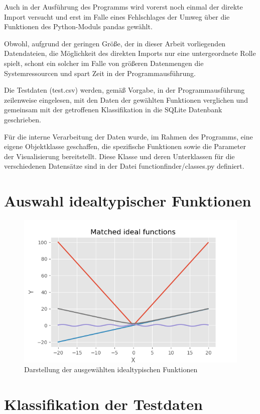 Auch in der Ausführung des Programms wird vorerst noch einmal der direkte Import versucht und erst im Falle eines Fehlschlages der Umweg über die Funktionen des Python-Moduls pandas gewählt.

Obwohl, aufgrund der geringen Größe, der in dieser Arbeit vorliegenden Datendateien, die Möglichkeit des direkten Imports nur eine untergeordnete Rolle spielt, schont ein solcher im Falle von größeren Datenmengen die Systemressourcen und spart Zeit in der Programmausführung.

Die Testdaten (test.csv) werden, gemäß Vorgabe, in der Programmausführung zeilenweise eingelesen, mit den Daten der gewählten Funktionen verglichen und gemeinsam mit der getroffenen Klassifikation in die SQLite Datenbank geschrieben.

Für die interne Verarbeitung der Daten wurde, im Rahmen des Programms, eine eigene Objektklasse geschaffen, die spezifische Funktionen sowie die Parameter der Visualisierung bereitstellt. Diese Klasse und deren Unterklassen für die verschiedenen Datensätze sind in der Datei functionfinder/classes.py definiert.

\section{Auswahl idealtypischer Funktionen}

\begin{figure}[h]
\centering
\includegraphics[width=12cm]{../output/figures/ideal.png}
\caption{Darstellung der ausgewählten idealtypischen Funktionen \cite{Gage:18}}\label{fig:ideal}
\end{figure}

\section{Klassifikation der Testdaten}

